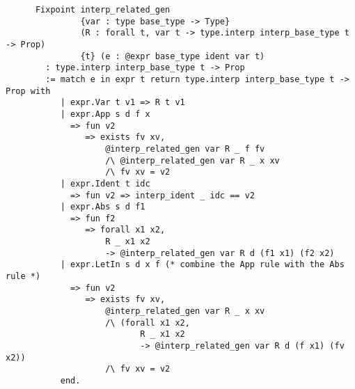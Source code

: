 \begin{itemize}
\begin{verbatim}
      Fixpoint interp_related_gen
               {var : type base_type -> Type}
               (R : forall t, var t -> type.interp interp_base_type t -> Prop)
               {t} (e : @expr base_type ident var t)
        : type.interp interp_base_type t -> Prop
        := match e in expr t return type.interp interp_base_type t -> Prop with
           | expr.Var t v1 => R t v1
           | expr.App s d f x
             => fun v2
                => exists fv xv,
                    @interp_related_gen var R _ f fv
                    /\ @interp_related_gen var R _ x xv
                    /\ fv xv = v2
           | expr.Ident t idc
             => fun v2 => interp_ident _ idc == v2
           | expr.Abs s d f1
             => fun f2
                => forall x1 x2,
                    R _ x1 x2
                    -> @interp_related_gen var R d (f1 x1) (f2 x2)
           | expr.LetIn s d x f (* combine the App rule with the Abs rule *)
             => fun v2
                => exists fv xv,
                    @interp_related_gen var R _ x xv
                    /\ (forall x1 x2,
                           R _ x1 x2
                           -> @interp_related_gen var R d (f x1) (fv x2))
                    /\ fv xv = v2
           end.


\end{verbatim}
\end{itemize}

